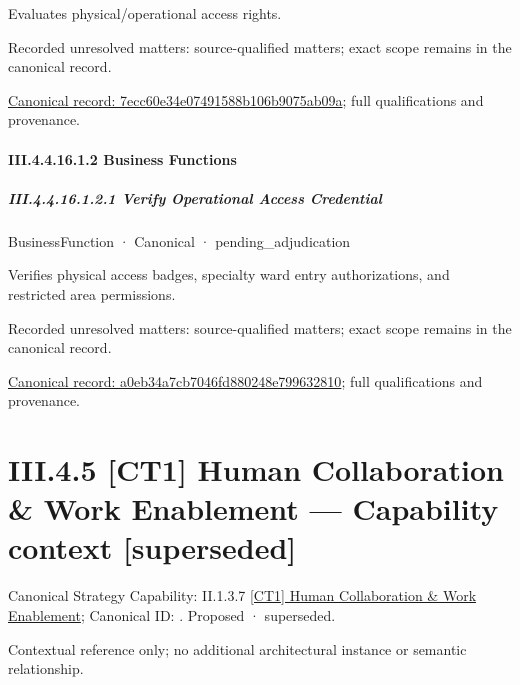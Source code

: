 Evaluates physical/operational access rights.


{\small Recorded unresolved matters: source-qualified matters; exact scope remains in the canonical record.}\par
{\footnotesize \href{../../../../continuum/business/business-service/7ecc60e34e07491588b106b9075ab09a.md}{Canonical record: 7ecc60e34e07491588b106b9075ab09a}; full qualifications and provenance.}\par
\paragraph*{III.4.4.16.1.2 Business Functions}
\label{navigation:III.4.4.16.1.2}

\subparagraph*{III.4.4.16.1.2.1 Verify Operational Access Credential}
\label{navigation:III.4.4.16.1.2.1}

\label{element:a0eb34a7cb7046fd880248e799632810}
{\small BusinessFunction · Canonical · pending\_adjudication}\par

Verifies physical access badges, specialty ward entry authorizations, and restricted area permissions.


{\small Recorded unresolved matters: source-qualified matters; exact scope remains in the canonical record.}\par
{\footnotesize \href{../../../../continuum/business/business-function/a0eb34a7cb7046fd880248e799632810.md}{Canonical record: a0eb34a7cb7046fd880248e799632810}; full qualifications and provenance.}\par
\section*{III.4.5 [CT1] Human Collaboration \& Work Enablement — Capability context [superseded]}
\label{navigation:III.4.5}

{\small Canonical Strategy Capability: II.1.3.7 \hyperref[element:c9347f73b21242c5b8cce41252b74da0]{[CT1] Human Collaboration \& Work Enablement}; Canonical ID: \texttt{}. Proposed · superseded.}\par
Contextual reference only; no additional architectural instance or semantic relationship.\par
